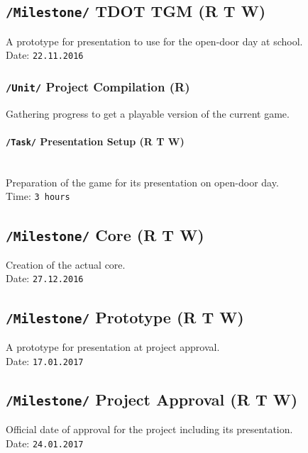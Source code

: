 \documentclass[11pt]{article}
\begin{document}
\subsection{\texttt{/Milestone/} TDOT TGM \small{(R T W)}}
A prototype for presentation to use for the open-door day at school.
\\ Date: \texttt{22.11.2016}
\subsubsection{\texttt{/Unit/} Project Compilation \small{(R)}}
Gathering progress to get a playable version of the current game.
\paragraph{\texttt{/Task/} Presentation Setup \small{(R T W)}}~\\
Preparation of the game for its presentation on open-door day.
\\ Time: \texttt{3 hours}

\subsection{\texttt{/Milestone/} Core \small{(R T W)}}
Creation of the actual core.
\\ Date: \texttt{27.12.2016}

\subsection{\texttt{/Milestone/} Prototype \small{(R T W)}}
A prototype for presentation at project approval.
\\ Date: \texttt{17.01.2017}

\subsection{\texttt{/Milestone/} Project Approval \small{(R T W)}}
Official date of approval for the project including its presentation.
\\ Date: \texttt{24.01.2017}
\end{document}
